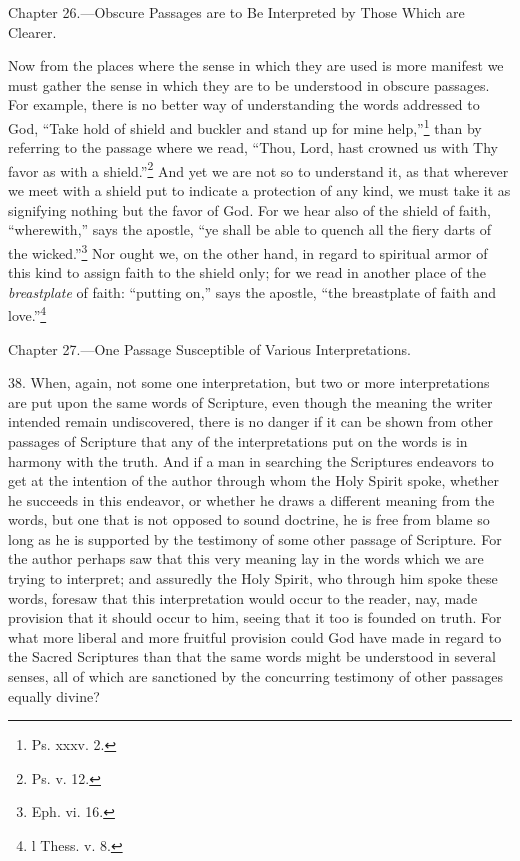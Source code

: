 
Chapter 26.—Obscure Passages are to Be Interpreted by Those Which are Clearer.

Now from the places where the sense in which they are used is more manifest we must gather the sense in which they are to be understood in obscure passages. For example, there is no better way of understanding the words addressed to God, “Take hold of shield and buckler and stand up for mine help,”\footnote{Ps. xxxv. 2.} than by referring to the passage where we read, “Thou, Lord, hast crowned us with Thy favor as with a shield.”\footnote{Ps. v. 12.} And yet we are not so to understand it, as that wherever we meet with a shield put to indicate a protection of any kind, we must take it as signifying nothing but the favor of God. For we hear also of the shield of faith, “wherewith,” says the apostle, “ye shall be able to quench all the fiery darts of the wicked.”\footnote{Eph. vi. 16.} Nor ought we, on the other hand, in regard to spiritual armor of this kind to assign faith to the shield only; for we read in another place of the \emph{breastplate} of faith: “putting on,” says the apostle, “the breastplate of faith and love.”\footnote{l Thess. v. 8.}


Chapter 27.—One Passage Susceptible of Various Interpretations.

38. When, again, not some one interpretation, but two or more interpretations are put upon the same words of Scripture, even though the meaning the writer intended remain undiscovered, there is no danger if it can be shown from other passages of Scripture that any of the interpretations put on the words is in harmony with the truth. And if a man in searching the Scriptures endeavors to get at the intention of the author through whom the Holy Spirit spoke, whether he succeeds in this endeavor, or whether he draws a different meaning from the words, but one that is not opposed to sound doctrine, he is free from blame so long as he is supported by the testimony of some other passage of Scripture. For the author perhaps saw that this very meaning lay in the words which we are trying to interpret; and assuredly the Holy Spirit, who through him spoke these words, foresaw that this interpretation would occur to the reader, nay, made provision that it should occur to him, seeing that it too is founded on truth. For what more liberal and more fruitful provision could God have made in regard to the Sacred Scriptures than that the same words might be understood in several senses, all of which are sanctioned by the concurring testimony of other passages equally divine?

